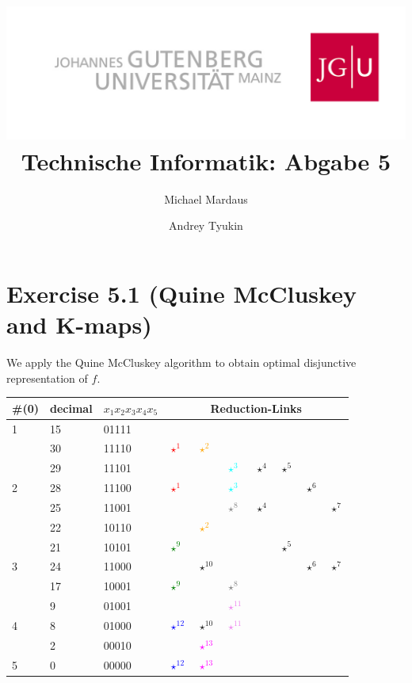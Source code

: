 \documentclass[10pt,a4paper]{scrartcl}
\author{Michael Mardaus \and Andrey Tyukin}
\title{\includegraphics[scale=0.2]{../logo_schriftzug}\\
Technische Informatik: Abgabe 5}
\newcommand{\subExercise}[1]{\vspace{0.5em} \noindent{\bf #1)}}
\begin{document}
\maketitle

\section*{Exercise 5.1 (Quine McCluskey and K-maps)}
\subExercise{a} We apply the Quine McCluskey algorithm to obtain optimal disjunctive representation of $f$.

\vspace{0.5em}
\begin{tabular}{|l||l|l|l|l|l|l|l|l|l|}\hline
\#(0) & decimal & $x_1x_2x_3x_4x_5$ & \multicolumn{7}{c|}{Reduction-Links}                \\\hline\hline
1     & 15      & 01111             & &&&&&&                                   \\
      & 30      & 11110             & \textcolor{red}{$\star^1$} & \textcolor{orange}{$\star^2$} &&&&&              \\
      & 29      & 11101             & &&\textcolor{cyan}{$\star^3$}&$\star^4$&$\star^5$&&        \\\hline
2     & 28      & 11100             & \textcolor{red}{$\star^1$}&&\textcolor{cyan}{$\star^3$}&&&$\star^6$&        \\
      & 25      & 11001             & &&\textcolor{gray}{$\star^8$}&$\star^4$&&&$\star^7$        \\
      & 22      & 10110             & &\textcolor{orange}{$\star^2$}&&&&&                          \\
      & 21      & 10101             & \textcolor{green}{$\star^9$}&&&&$\star^5$&&                 \\\hline
3     & 24      & 11000             & &$\star^{10}$&&&&$\star^6$&$\star^7$     \\
      & 17      & 10001             & \textcolor{green}{$\star^9$}&&\textcolor{gray}{$\star^8$}&&&&                 \\
      & 9       & 01001             & &&\textcolor{violet}{$\star^{11}$}&&&&                       \\\hline
4     & 8       & 01000             & \textcolor{blue}{$\star^{12}$}&$\star^{10}$&\textcolor{violet}{$\star^{11}$}&&&&\\
      & 2       & 00010             & &\textcolor{magenta}{$\star^{13}$}&&&&&                       \\\hline
5     & 0       & 00000             & \textcolor{blue}{$\star^{12}$}&\textcolor{magenta}{$\star^{13}$}&&&&&           \\\hline
\end{tabular}\\
\end{document}
